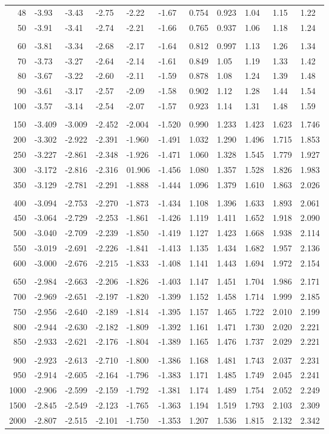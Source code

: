 \documentclass[draft]{article}
\begin{document}
\begin{table}
\begin{center}
\begin{tabular}{rllllllllll}
48&-3.93&-3.43&-2.75&-2.22&-1.67&0.754&0.923&1.04&1.15&1.22\\
50&-3.91&-3.41&-2.74&-2.21&-1.66&0.765&0.937&1.06&1.18&1.24\\
\\
60&-3.81&-3.34&-2.68&-2.17&-1.64&0.812&0.997&1.13&1.26&1.34\\
70&-3.73&-3.27&-2.64&-2.14&-1.61&0.849&1.05&1.19&1.33&1.42\\
80&-3.67&-3.22&-2.60&-2.11&-1.59&0.878&1.08&1.24&1.39&1.48\\
90&-3.61&-3.17&-2.57&-2.09&-1.58&0.902&1.12&1.28&1.44&1.54\\
100&-3.57&-3.14&-2.54&-2.07&-1.57&0.923&1.14&1.31&1.48&1.59\\
\\
150&-3.409&-3.009&-2.452&-2.004&-1.520&0.990&1.233&1.423&1.623&1.746\\
200&-3.302&-2.922&-2.391&-1.960&-1.491&1.032&1.290&1.496&1.715&1.853\\
250&-3.227&-2.861&-2.348&-1.926&-1.471&1.060&1.328&1.545&1.779&1.927\\
300&-3.172&-2.816&-2.316&01.906&-1.456&1.080&1.357&1.528&1.826&1.983\\
350&-3.129&-2.781&-2.291&-1.888&-1.444&1.096&1.379&1.610&1.863&2.026\\
\\
400&-3.094&-2.753&-2.270&-1.873&-1.434&1.108&1.396&1.633&1.893&2.061\\
450&-3.064&-2.729&-2.253&-1.861&-1.426&1.119&1.411&1.652&1.918&2.090\\
500&-3.040&-2.709&-2.239&-1.850&-1.419&1.127&1.423&1.668&1.938&2.114\\
550&-3.019&-2.691&-2.226&-1.841&-1.413&1.135&1.434&1.682&1.957&2.136\\
600&-3.000&-2.676&-2.215&-1.833&-1.408&1.141&1.443&1.694&1.972&2.154\\
\\
650&-2.984&-2.663&-2.206&-1.826&-1.403&1.147&1.451&1.704&1.986&2.171\\
700&-2.969&-2.651&-2.197&-1.820&-1.399&1.152&1.458&1.714&1.999&2.185\\
750&-2.956&-2.640&-2.189&-1.814&-1.395&1.157&1.465&1.722&2.010&2.199\\
800&-2.944&-2.630&-2.182&-1.809&-1.392&1.161&1.471&1.730&2.020&2.221\\
850&-2.933&-2.621&-2.176&-1.804&-1.389&1.165&1.476&1.737&2.029&2.221\\
\\
900&-2.923&-2.613&-2.710&-1.800&-1.386&1.168&1.481&1.743&2.037&2.231\\
950&-2.914&-2.605&-2.164&-1.796&-1.383&1.171&1.485&1.749&2.045&2.241\\
1000&-2.906&-2.599&-2.159&-1.792&-1.381&1.174&1.489&1.754&2.052&2.249\\
1500&-2.845&-2.549&-2.123&-1.765&-1.363&1.194&1.519&1.793&2.103&2.309\\
2000&-2.807&-2.515&-2.101&-1.750&-1.353&1.207&1.536&1.815&2.132&2.342\\
\hline
\end{tabular}
\end{center}
\end{table}
\end{document}
